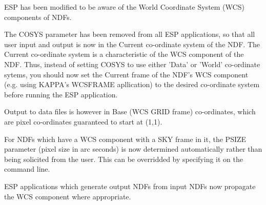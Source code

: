 \documentclass[twoside,11pt]{article}
\newcommand{\htmladdnormallink}[2]{#1}
\newcommand{\xref}[3]{#1}
\newcommand{\xlabel}[1]{}
\begin{document}
ESP has been modified to be aware of the World Coordinate
System (WCS) components of NDFs.

The COSYS parameter has been removed from all ESP applications,
so that all user input and output is now in the Current
co-ordinate system of the NDF.  The Current co-ordinate system
is a characteristic of the WCS component of the NDF.
Thus, instead of setting COSYS to use either 'Data' or 'World'
co-ordinate sytems, you should now set the Current frame of the
NDF's WCS component (e.g. using KAPPA's WCSFRAME apllication)
to the desired co-ordinate system before running the ESP
application.

Output to data files is however in Base (WCS GRID frame)
co-ordinates, which are pixel co-ordinates guaranteed to start
at (1,1).

For NDFs which have a WCS component with a SKY frame in it, the
PSIZE parameter (pixel size in arc seconds) is now determined
automatically rather than being solicited from the user.
This can be overridded by specifying it on the command line.

ESP applications which generate output NDFs from input NDFs now
propagate the WCS component where appropriate.





%

%
%
\end{document}
